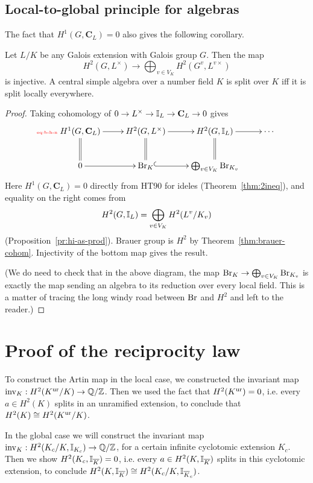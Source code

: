 \subsection{Local-to-global principle for algebras}
The fact that $H^1(G, \mathbf C_L)=0$ also gives the following corollary.
\begin{thm}
Let $L/K$ be any Galois extension with Galois group $G$. Then the map
\[
H^2(G,L^{\times})\to \bigoplus_{v\in V_K} H^2(G^v,L^{v\times})
\]
is injective. 
A central simple algebra over a number field $K$ is split over $K$ iff it is split locally everywhere.
\end{thm}
\begin{proof}
Taking cohomology of $0\to L^{\times} \to \mathbb{I}_L\to \mathbf C_L\to 0$ gives
\begin{equation}\llabel{eq:b-h-n}
\xymatrix{
H^{1}(G,\mathbf C_L)\ar@{=}[d]
\ar[r] & H^2(G,L^{\times}) \ar[r]\ar@{=}[d] & 
H^2(G,\I_L)\ar[r]\ar@{=}[d] & \cdots\\
0 \ar[r] & \Br_K \ar@{^(->}[r]&\bigopl_{v\in V_K} \Br_{K_v}&
}
\end{equation}
Here $H^{1}(G,\mathbf C_L)=0$ directly from HT90 for ideles (Theorem~\ref{thm:2ineq}), and equality on the right comes from
\[
H^2(G,\mathbb{I}_L)=\bigoplus_{v\in V_K} H^2(L^v/K_v)
\]
(Proposition~\ref{pr:hi-as-prod}).
Brauer group is $H^2$ by Theorem~\ref{thm:brauer-cohom}. 
Injectivity of the bottom map gives the result.

(We do need to check that in the above diagram, the map $\operatorname{Br}_K\to \bigoplus_{v\in V_K} \operatorname{Br}_{K_v}$ is exactly the map sending an algebra to its reduction over every local field. This is a matter of tracing the long windy road between $\operatorname{Br}$ and $H^2$ and left to the reader.)
\end{proof}
%
\section{Proof of the reciprocity law}
To construct the Artin map in the local case, we constructed the invariant map $\operatorname{inv}_K:H^2(K^{\text{ur}}/K)\to \mathbb{Q}/\mathbb{Z}$. Then we
used the fact that $H^2(K^{\text{ur}})=0$, i.e. every $a\in H^2(K)$ splits in an unramified extension, to conclude that $H^2(K)\cong H^2(K^{\text{ur}}/K)$.

In the global case we will construct the invariant map $\operatorname{inv}_K:H^2(K_c/K,\mathbb{I}_{K_c})\to \mathbb{Q}/\mathbb{Z}$, for a certain infinite cyclotomic extension $K_c$. Then we show
$H^2(K_c,\mathbb{I}_{\overline{K}})=0$, i.e. every $a\in H^2(K,\mathbb{I}_{\overline{K}})$ splits in this cyclotomic extension, to conclude $H^2(K,\mathbb{I}_{\overline{K}})\cong H^2(K_c/K,\mathbb{I}_{\overline{K}_c})$. 

